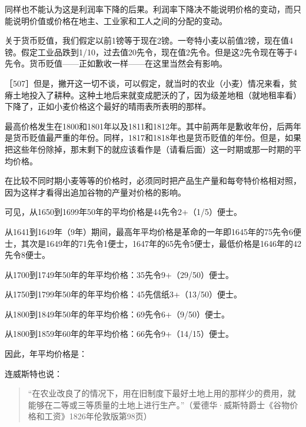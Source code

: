 同样也不能认为这是利润率下降的后果。利润率下降决不能说明价格的变动，而只能说明价值或价格在地主、工业家和工人之间的分配的变动。

关于货币贬值，我们假定以前1镑等于现在2镑。一夸特小麦以前值2镑，现在值4镑。假定工业品跌到1/10，过去值20先令，现在值2先令。但是这2先令现在等于4先令。货币贬值——正如歉收一样——在这里当然会有影响。

［507］但是，撇开这一切不谈，可以假定，就当时的农业（小麦）情况来看，贫瘠土地投入了耕种。这种土地后来就变成肥沃的了，因为级差地租（就地租率看）下降了，正如小麦价格这个最好的晴雨表所表明的那样。

最高价格发生在1800和1801年以及1811和1812年。其中前两年是歉收年份，后两年是货币贬值最严重的年份。同样，1817和1818年也是货币贬值的年份。但是，如果把这些年份除掉，那末剩下的就应该看作是（请看后面）这一时期或那一时期的平均价格。

在比较不同时期小麦等等的价格时，必须同时把产品生产量和每夸特价格相对照，因为这样才看得出追加谷物的产量对价格的影响。

\todo{}

可见，从1650到1699年50年的平均价格是44先令2+（1/5）便士。

从1641到1649年（9年）期间，最高年平均价格是革命的一年即1645年的75先令6便士，其次是1649年的71先令1便士，1647年的65先令5便士，最低价格是1646年的42先令8便士。

\todo{}

从1700到1749年50年的年平均价格：35先令9+（29/50）便士。

\todo{}

从1750到1799年50年的年平均价格：45先信纸3+（13/50）便士。

\todo{}

从1800到1849年50年的年平均价格：69先令6+（9/50）便士。

从1800到1859年60年的年平均价格：66先令9+（14/15）便士。

因此，年平均价格是：

\todo{}


连威斯特也说：

\begin{quote}{“在农业改良了的情况下，用在旧制度下最好土地上用的那样少的费用，就能够在二等或三等质量的土地上进行生产。”（爱德华·威斯特爵士《谷物价格和工资》1826年伦敦版第98页）}\end{quote}



